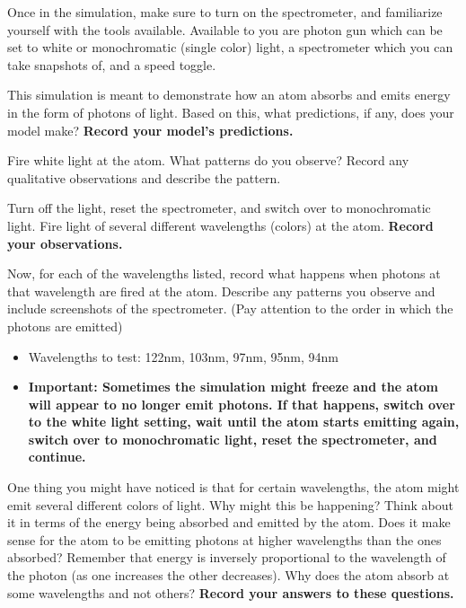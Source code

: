 \begin{steps} 
	\item Once in the simulation, make sure to turn on the spectrometer, and familiarize yourself with the tools available. Available to you are photon gun which can be set to white or monochromatic (single color) light, a spectrometer which you can take snapshots of, and a speed toggle.
	
	\item This simulation is meant to demonstrate how an atom absorbs and emits energy in the form of photons of light. Based on this, what predictions, if any, does your model make? \textbf{Record your model's predictions.}
	
	\item Fire white light at the atom. What patterns do you observe? Record any qualitative observations and describe the pattern. 
	
	\item Turn off the light, reset the spectrometer, and switch over to monochromatic light. Fire light of several different wavelengths (colors) at the atom. \textbf{Record your observations.}
	
	\item Now, for each of the wavelengths listed, record what happens when photons at that wavelength are fired at the atom. Describe any patterns you observe and include screenshots of the spectrometer. (Pay attention to the order in which the photons are emitted)
	\begin{itemize}
		\item Wavelengths to test: 122nm, 103nm, 97nm, 95nm, 94nm 
		
		\item \textbf{Important: Sometimes the simulation might freeze and the atom will appear to no longer emit photons. If that happens, switch over to the white light setting, wait until the atom starts emitting again, switch over to monochromatic light, reset the spectrometer, and continue.}
	\end{itemize}
	
	\item One thing you might have noticed is that for certain wavelengths, the atom might emit several different colors of light. Why might this be happening? Think about it in terms of the energy being absorbed and emitted by the atom. Does it make sense for the atom to be emitting photons at higher wavelengths than the ones absorbed? Remember that energy is inversely proportional to the wavelength of the photon (as one increases the other decreases). Why does the atom absorb at some wavelengths and not others? \textbf{Record your answers to these questions.} 
	

\end{steps}

